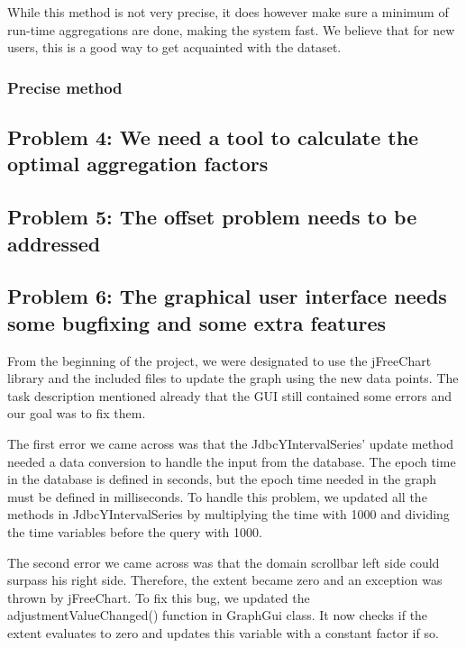 
While this method is not very precise, it does however make sure a minimum of run-time aggregations are done, making the system fast. We believe that for new users, this is a good way to get acquainted with the dataset.

\subsubsection{Precise method}

\subsection{Problem 4: We need a tool to calculate the optimal aggregation factors}
\subsection{Problem 5: The offset problem needs to be addressed}
\subsection{Problem 6: The graphical user interface needs some bugfixing and some extra features}
From the beginning of the project, we were designated to use the jFreeChart library and the included files to update the graph using the new data points. The task description mentioned already that the GUI still contained some errors and our goal was to fix them.

The first error we came across was that the JdbcYIntervalSeries' update method needed a data conversion to handle the input from the database. The epoch time in the database is defined in seconds, but the epoch time needed in the graph must be defined in milliseconds. To handle this problem, we updated all the methods in JdbcYIntervalSeries by multiplying the time with 1000 and dividing the time variables before the query with 1000.

The second error we came across was that the domain scrollbar left side could surpass his right side. Therefore, the extent became zero and an exception was thrown by jFreeChart. To fix this bug, we updated the adjustmentValueChanged() function in GraphGui class. It now checks if the extent evaluates to zero and updates this variable with a constant factor if so.

